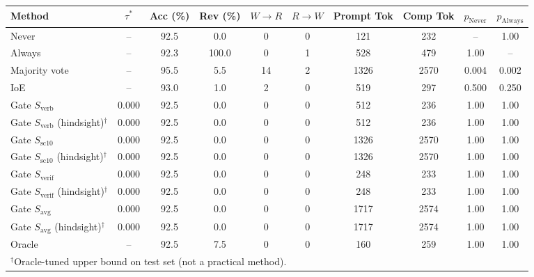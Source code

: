 \begin{tabular}{lccccccccc}
\toprule
Method & $\tau^*$ & Acc (\%) & Rev (\%) & $W\to R$ & $R\to W$ & Prompt Tok & Comp Tok & $p_{\text{Never}}$ & $p_{\text{Always}}$ \\
\midrule
Never & -- & 92.5 & 0.0 & 0 & 0 & 121 & 232 & -- & 1.00 \\
Always & -- & 92.3 & 100.0 & 0 & 1 & 528 & 479 & 1.00 & -- \\
Majority vote & -- & 95.5 & 5.5 & 14 & 2 & 1326 & 2570 & 0.004 & 0.002 \\
IoE & -- & 93.0 & 1.0 & 2 & 0 & 519 & 297 & 0.500 & 0.250 \\
\midrule
Gate $S_{\text{verb}}$ & 0.000 & 92.5 & 0.0 & 0 & 0 & 512 & 236 & 1.00 & 1.00 \\
Gate $S_{\text{verb}}$ (hindsight)$^\dagger$ & 0.000 & 92.5 & 0.0 & 0 & 0 & 512 & 236 & 1.00 & 1.00 \\
Gate $S_{\text{sc10}}$ & 0.000 & 92.5 & 0.0 & 0 & 0 & 1326 & 2570 & 1.00 & 1.00 \\
Gate $S_{\text{sc10}}$ (hindsight)$^\dagger$ & 0.000 & 92.5 & 0.0 & 0 & 0 & 1326 & 2570 & 1.00 & 1.00 \\
Gate $S_{\text{verif}}$ & 0.000 & 92.5 & 0.0 & 0 & 0 & 248 & 233 & 1.00 & 1.00 \\
Gate $S_{\text{verif}}$ (hindsight)$^\dagger$ & 0.000 & 92.5 & 0.0 & 0 & 0 & 248 & 233 & 1.00 & 1.00 \\
Gate $S_{\text{avg}}$ & 0.000 & 92.5 & 0.0 & 0 & 0 & 1717 & 2574 & 1.00 & 1.00 \\
Gate $S_{\text{avg}}$ (hindsight)$^\dagger$ & 0.000 & 92.5 & 0.0 & 0 & 0 & 1717 & 2574 & 1.00 & 1.00 \\
\midrule
Oracle & -- & 92.5 & 7.5 & 0 & 0 & 160 & 259 & 1.00 & 1.00 \\
\bottomrule
\multicolumn{10}{l}{\footnotesize $^\dagger$Oracle-tuned upper bound on test set (not a practical method).}\\
\end{tabular}
